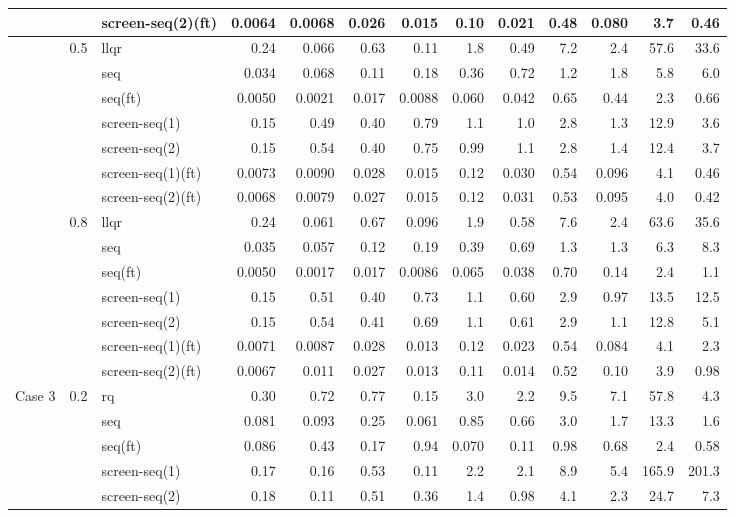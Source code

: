 \begin{longtable}{lllrrrrrrrrrr}
 &  & screen-seq(2)(ft) & 0.0064 & 0.0068 & 0.026 & 0.015 & 0.10 & 0.021 & 0.48 & 0.080 & 3.7 & 0.46\\
\midrule
 & 0.5 & llqr & 0.24 & 0.066 & 0.63 & 0.11 & 1.8 & 0.49 & 7.2 & 2.4 & 57.6 & 33.6\\
 &  & seq & 0.034 & 0.068 & 0.11 & 0.18 & 0.36 & 0.72 & 1.2 & 1.8 & 5.8 & 6.0\\
 &  & seq(ft) & 0.0050 & 0.0021 & 0.017 & 0.0088 & 0.060 & 0.042 & 0.65 & 0.44 & 2.3 & 0.66\\
 &  & screen-seq(1) & 0.15 & 0.49 & 0.40 & 0.79 & 1.1 & 1.0 & 2.8 & 1.3 & 12.9 & 3.6\\
 &  & screen-seq(2) & 0.15 & 0.54 & 0.40 & 0.75 & 0.99 & 1.1 & 2.8 & 1.4 & 12.4 & 3.7\\
 &  & screen-seq(1)(ft) & 0.0073 & 0.0090 & 0.028 & 0.015 & 0.12 & 0.030 & 0.54 & 0.096 & 4.1 & 0.46\\
 &  & screen-seq(2)(ft) & 0.0068 & 0.0079 & 0.027 & 0.015 & 0.12 & 0.031 & 0.53 & 0.095 & 4.0 & 0.42\\
\midrule
 & 0.8 & llqr & 0.24 & 0.061 & 0.67 & 0.096 & 1.9 & 0.58 & 7.6 & 2.4 & 63.6 & 35.6\\
 &  & seq & 0.035 & 0.057 & 0.12 & 0.19 & 0.39 & 0.69 & 1.3 & 1.3 & 6.3 & 8.3\\
 &  & seq(ft) & 0.0050 & 0.0017 & 0.017 & 0.0086 & 0.065 & 0.038 & 0.70 & 0.14 & 2.4 & 1.1\\
 &  & screen-seq(1) & 0.15 & 0.51 & 0.40 & 0.73 & 1.1 & 0.60 & 2.9 & 0.97 & 13.5 & 12.5\\
 &  & screen-seq(2) & 0.15 & 0.54 & 0.41 & 0.69 & 1.1 & 0.61 & 2.9 & 1.1 & 12.8 & 5.1\\
 &  & screen-seq(1)(ft) & 0.0071 & 0.0087 & 0.028 & 0.013 & 0.12 & 0.023 & 0.54 & 0.084 & 4.1 & 2.3\\
 &  & screen-seq(2)(ft) & 0.0067 & 0.011 & 0.027 & 0.013 & 0.11 & 0.014 & 0.52 & 0.10 & 3.9 & 0.98\\
\midrule
Case 3 & 0.2 & rq & 0.30 & 0.72 & 0.77 & 0.15 & 3.0 & 2.2 & 9.5 & 7.1 & 57.8 & 4.3\\
 &  & seq & 0.081 & 0.093 & 0.25 & 0.061 & 0.85 & 0.66 & 3.0 & 1.7 & 13.3 & 1.6\\
 &  & seq(ft) & 0.086 & 0.43 & 0.17 & 0.94 & 0.070 & 0.11 & 0.98 & 0.68 & 2.4 & 0.58\\
 &  & screen-seq(1) & 0.17 & 0.16 & 0.53 & 0.11 & 2.2 & 2.1 & 8.9 & 5.4 & 165.9 & 201.3\\
 &  & screen-seq(2) & 0.18 & 0.11 & 0.51 & 0.36 & 1.4 & 0.98 & 4.1 & 2.3 & 24.7 & 7.3\\

\end{longtable}
